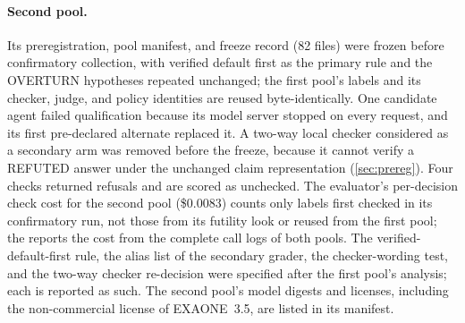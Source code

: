 \paragraph{Second pool.} Its preregistration, pool manifest, and freeze record (82 files) were frozen before confirmatory collection, with verified default first as the primary rule and the OVERTURN hypotheses repeated unchanged; the first pool's labels and its checker, judge, and policy identities are reused byte-identically. One candidate agent failed qualification because its model server stopped on every request, and its first pre-declared alternate replaced it. A two-way local checker considered as a secondary arm was removed before the freeze, because it cannot verify a REFUTED answer under the unchanged claim representation (\cref{sec:prereg}). Four checks returned refusals and are scored as unchecked. The evaluator's per-decision check cost for the second pool (\$0.0083) counts only labels first checked in its confirmatory run, not those from its futility look or reused from the first pool; the  reports the cost from the complete call logs of both pools. The verified-default-first rule, the alias list of the secondary grader, the checker-wording test, and the two-way checker re-decision were specified after the first pool's analysis; each is reported as such. The second pool's model digests and licenses, including the non-commercial license of EXAONE~3.5, are listed in its manifest.
